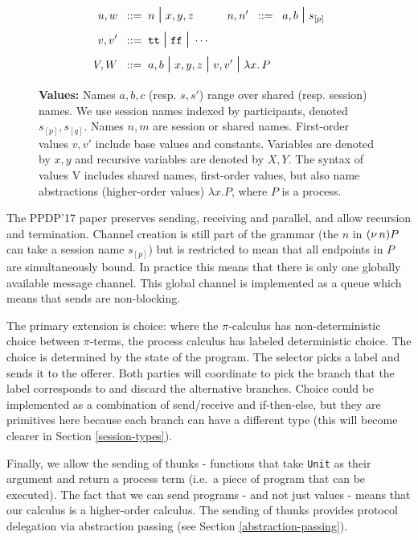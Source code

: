 \documentclass[runningheads,plain]{llncs}
\begin{document}
\begin{figure}
\begin{align*}
u,w  \;\;::=\;\;& n \;\mbox{\Large{$\mid$}}\; x,y,z
\qquad \quad
n,n' \;\;::=\;\; a,b \;\mbox{\Large{$\mid$}}\; s_{[p]}
\\
 {v},  {v}'  \;\;::=\;\; &  \mathtt{tt} \;\mbox{\Large{$\mid$}}\; \mathtt{ff} \;\mbox{\Large{$\mid$}}\; \cdots
\\
V,W \;\;::=\;\; & {a,b} \;\mbox{\Large{$\mid$}}\;  x,y,z \;\mbox{\Large{$\mid$}}\;  v, v' \;\mbox{\Large{$\mid$}}\; {\lambda x.\,P}
\end{align*}
\caption{\textbf{Values:}
Names $a,b,c$ (resp. $s,s'$) range over shared (resp. session) names.
We use session names indexed by participants, denoted $s_{[p]},s_{[q]}$.
Names $n,m$ are session or shared names. First-order values $v,v'$ 
include base values and constants. Variables are denoted by $x,y$ and
recursive variables are denoted by $X,Y$. The syntax of values V includes shared names, 
first-order values, but also name abstractions
(higher-order values) $\lambda x. P$, where $P$ is a process.
}
\end{figure}

The PPDP'17 paper preserves sending, receiving and parallel, and allow
recursion and termination. Channel creation is still part of the grammar
(the \(n\) in \((\nu\, n)P\) can take a session name \(s_{[p]}\)) but is
restricted to mean that all endpoints in \(P\) are simultaneously bound.
In practice this means that there is only one globally available message
channel. This global channel is implemented as a queue which means that
sends are non-blocking.

The primary extension is choice: where the \(\pi\)-calculus has
non-deterministic choice between \(\pi\)-terms, the process calculus has
labeled deterministic choice. The choice is determined by the state of
the program. The selector picks a label and sends it to the offerer.
Both parties will coordinate to pick the branch that the label
corresponds to and discard the alternative branches. Choice could be
implemented as a combination of send/receive and if-then-else, but they
are primitives here because each branch can have a different type (this
will become clearer in Section \ref{session-types}).

Finally, we allow the sending of thunks - functions that take
\texttt{Unit} as their argument and return a process term (i.e.~a piece
of program that can be executed). The fact that we can send programs -
and not just values - means that our calculus is a higher-order
calculus. The sending of thunks provides protocol delegation via
abstraction passing (see Section \ref{abstraction-passing}).
\end{document}
